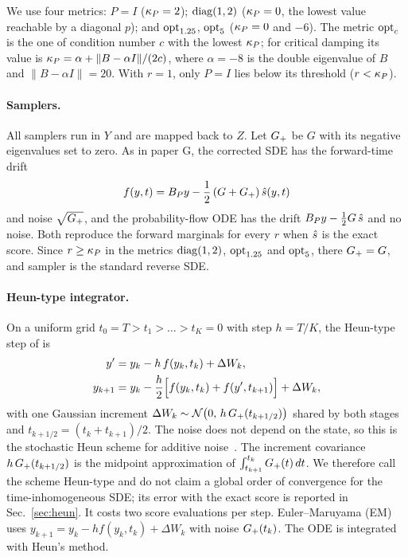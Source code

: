 We use four metrics:
$P=I$ ($\kappa_P=2$);
$\mathrm{diag}(1,2)$ ($\kappa_P=0$, the lowest value reachable by a diagonal $p$);
and $\mathrm{opt}_{1.25}$, $\mathrm{opt}_{5}$ ($\kappa_P=0$ and $-6$).
The metric $\mathrm{opt}_{c}$ is the one of condition number $c$ with the lowest $\kappa_P$; for critical damping its value is $\kappa_P=\alpha+\|B-\alpha I\|/(2c)$, where $\alpha=-8$ is the double eigenvalue of $B$ and $\|B-\alpha I\|=20$.
With $r=1$, only $P=I$ lies below its threshold ($r<\kappa_P$).

\paragraph*{Samplers.}
All samplers run in $Y$ and are mapped back to $Z$.
Let $G_{+}$ be $G$ with its negative eigenvalues set to zero.
As in paper G, the corrected SDE \Sb{} has the forward-time drift
\begin{equation}
f(y,t)=B_Py-\frac{1}{2}\left(G+G_{+}\right)\hat s(y,t)
\label{eq:drift}
\end{equation}
and noise $\sqrt{G_{+}}$, and the probability-flow ODE \Sc{} has the drift $B_Py-\frac12 G\,\hat s$ and no noise.
Both reproduce the forward marginals for every $r$ when $\hat s$ is the exact score.
Since $r\geq\kappa_P$ in the metrics $\mathrm{diag}(1,2)$, $\mathrm{opt}_{1.25}$ and $\mathrm{opt}_{5}$, there $G_{+}=G$, and sampler \Sb{} is the standard reverse SDE.

\paragraph*{Heun-type integrator.}
On a uniform grid $t_0=T>t_1>\dots>t_K=0$ with step $h=T/K$, the Heun-type step of \Sb{} is
\begin{align}
y'&=y_k-h\,f(y_k,t_k)+\Delta W_k,\nonumber\\
y_{k+1}&=y_k-\frac{h}{2}\Bigl[f(y_k,t_k)+f(y',t_{k+1})\Bigr]+\Delta W_k,
\label{eq:heun}
\end{align}
with one Gaussian increment $\Delta W_k\sim\mathcal N\bigl(0,\,h\,G_{+}(t_{k+1/2})\bigr)$ shared by both stages and $t_{k+1/2}=(t_k+t_{k+1})/2$.
The noise does not depend on the state, so this is the stochastic Heun scheme for additive noise~\cite{kloeden1992numerical}.
The increment covariance $h\,G_{+}(t_{k+1/2})$ is the midpoint approximation of $\int_{t_{k+1}}^{t_k}G_{+}(t)\,dt$.
We therefore call the scheme Heun-type and do not claim a global order of convergence for the time-inhomogeneous SDE; its error with the exact score is reported in Sec.~\ref{sec:heun}.
It costs two score evaluations per step.
Euler--Maruyama (EM) uses $y_{k+1}=y_k-h f(y_k,t_k)+\Delta W_k$ with noise $G_{+}(t_k)$.
The ODE is integrated with Heun's method.

